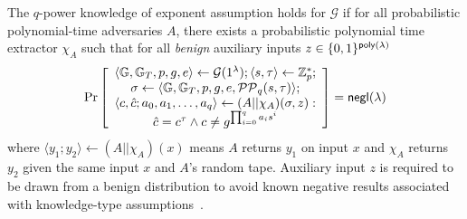 \begin{definition}
\label{d:q-pke}
The $q$-power knowledge of exponent assumption holds for $\mathcal{G}$ if for all probabilistic polynomial-time adversaries $A$, there exists a probabilistic polynomial time extractor $\chi_A$ such that for all \emph{benign} auxiliary inputs $z \in \{0,1\}^{\mathsf{poly}(\lambda)}$ 
\begin{align*}
\Pr \left[ \begin{array}{c}
    \langle \mathbb{G}, \mathbb{G}_T, p, g, e\rangle \leftarrow \mathcal{G}(1^\lambda); \langle s, \tau\rangle \leftarrow \mathbb{Z}_p^*;\\
    \sigma \leftarrow \langle \mathbb{G}, \mathbb{G}_T, p, g, e, \mathcal{PP}_q(s, \tau)\rangle;\\
    \langle c, \hat{c}; a_0, a_1, \dots, a_q\rangle \leftarrow (A||\chi_A)(\sigma,z):\\
    \hat{c} = c^\tau \wedge c \ne g^{\prod_{i=0}^q {a_i s^i}}
\end{array} \right] = \mathsf{negl}(\lambda)
\end{align*}
where $\langle y_1; y_2\rangle \leftarrow (A||\chi_A)(x)$ means $A$ returns $y_1$ on input $x$ and $\chi_A$ returns $y_2$ given the same input $x$ and $A$'s random tape.
Auxiliary input $z$ is required to be drawn from a benign distribution to avoid known negative results associated with knowledge-type assumptions~\cite{neg1,neg2}.
\end{definition}